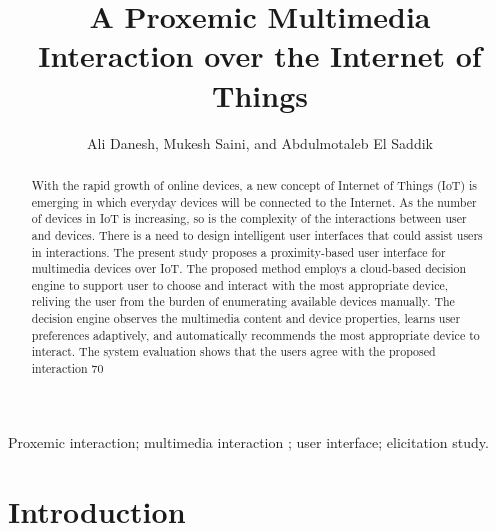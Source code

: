 \documentclass[]{IEEEphot}
\begin{document}
\title{A Proxemic Multimedia Interaction over the
Internet of Things}

\author{Ali Danesh, Mukesh Saini, and Abdulmotaleb El Saddik}


%

\maketitle




\begin{abstract}
With the rapid growth of online devices, a new concept of
Internet of Things (IoT) is emerging in which everyday devices will be
connected to the Internet. As the number of devices in IoT is increasing,
so is the complexity of the interactions between user and devices. There
is a need to design intelligent user interfaces that could assist users in
interactions. The present study proposes a proximity-based user interface for multimedia devices over IoT. The proposed method employs a
cloud-based decision engine to support user to choose and interact with
the most appropriate device, reliving the user from the burden of enumerating available devices manually. The decision engine observes the
multimedia content and device properties, learns user preferences adaptively, and automatically recommends the most appropriate device to
interact. The system evaluation shows that the users agree with the proposed interaction 70%
\end{abstract}

\begin{IEEEkeywords}
Proxemic interaction; multimedia interaction ; user interface; elicitation study.
\end{IEEEkeywords}

\section{Introduction}
\end{document}
